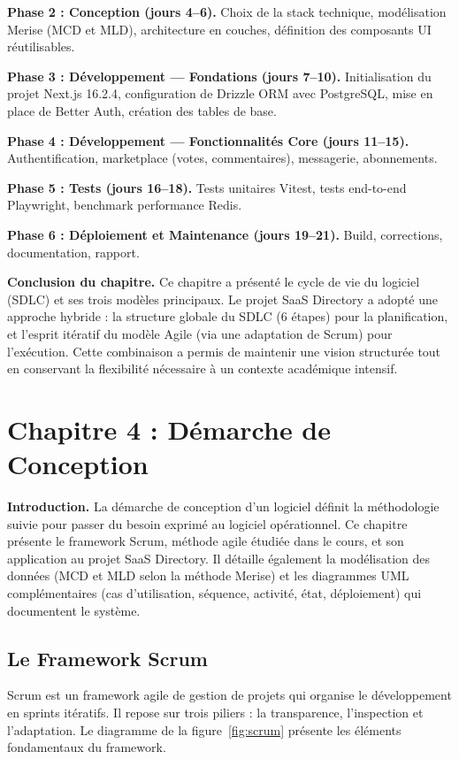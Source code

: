 \textbf{Phase 2 : Conception (jours 4--6).} Choix de la stack technique, modélisation Merise (MCD et MLD), architecture en couches, définition des composants UI réutilisables.

\textbf{Phase 3 : Développement --- Fondations (jours 7--10).} Initialisation du projet Next.js 16.2.4, configuration de Drizzle ORM avec PostgreSQL, mise en place de Better Auth, création des tables de base.

\textbf{Phase 4 : Développement --- Fonctionnalités Core (jours 11--15).} Authentification, marketplace (votes, commentaires), messagerie, abonnements.

\textbf{Phase 5 : Tests (jours 16--18).} Tests unitaires Vitest, tests end-to-end Playwright, benchmark performance Redis.

\textbf{Phase 6 : Déploiement et Maintenance (jours 19--21).} Build, corrections, documentation, rapport.

\textbf{Conclusion du chapitre.} Ce chapitre a présenté le cycle de vie du logiciel (SDLC) et ses trois modèles principaux. Le projet SaaS Directory a adopté une approche hybride : la structure globale du SDLC (6 étapes) pour la planification, et l'esprit itératif du modèle Agile (via une adaptation de Scrum) pour l'exécution. Cette combinaison a permis de maintenir une vision structurée tout en conservant la flexibilité nécessaire à un contexte académique intensif.


\section{Chapitre 4 : Démarche de Conception}

\textbf{Introduction.} La démarche de conception d'un logiciel définit la méthodologie suivie pour passer du besoin exprimé au logiciel opérationnel. Ce chapitre présente le framework Scrum, méthode agile étudiée dans le cours, et son application au projet SaaS Directory. Il détaille également la modélisation des données (MCD et MLD selon la méthode Merise) et les diagrammes UML complémentaires (cas d'utilisation, séquence, activité, état, déploiement) qui documentent le système.

\subsection{Le Framework Scrum}

Scrum est un framework agile de gestion de projets qui organise le développement en sprints itératifs. Il repose sur trois piliers : la transparence, l'inspection et l'adaptation. Le diagramme de la figure~\ref{fig:scrum} présente les éléments fondamentaux du framework.

